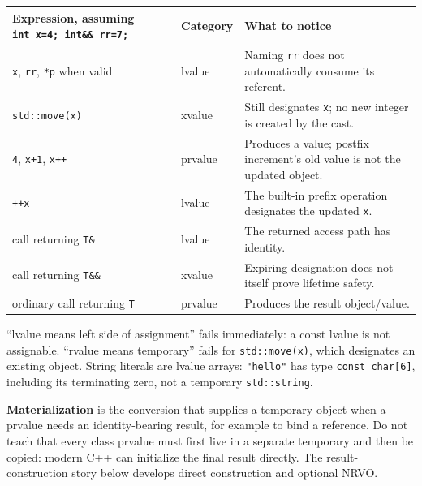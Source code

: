 {\def\LTcaptype{none} %
\begin{longtable}[]{@{}
  >{\raggedright\arraybackslash}p{}
  >{\raggedright\arraybackslash}p{}
  >{\raggedright\arraybackslash}p{}@{}}
\toprule\noalign{}
\begin{minipage}[b]{\linewidth}\raggedright
Expression, assuming \texttt{int\ x=4;\ int\&\&\ rr=7;}
\end{minipage} & \begin{minipage}[b]{\linewidth}\raggedright
Category
\end{minipage} & \begin{minipage}[b]{\linewidth}\raggedright
What to notice
\end{minipage} \\
\midrule\noalign{}
\endhead
\bottomrule\noalign{}
\endlastfoot
\texttt{x}, \texttt{rr}, \texttt{*p} when valid & lvalue & Naming \texttt{rr} does not automatically consume its referent. \\
\texttt{std::move(x)} & xvalue & Still designates \texttt{x}; no new integer is created by the cast. \\
\texttt{4}, \texttt{x+1}, \texttt{x++} & prvalue & Produces a value; postfix increment's old value is not the updated object. \\
\texttt{++x} & lvalue & The built-in prefix operation designates the updated \texttt{x}. \\
call returning \texttt{T\&} & lvalue & The returned access path has identity. \\
call returning \texttt{T\&\&} & xvalue & Expiring designation does not itself prove lifetime safety. \\
ordinary call returning \texttt{T} & prvalue & Produces the result object/value. \\
\end{longtable}
}

``lvalue means left side of assignment'' fails immediately: a const lvalue is not assignable. ``rvalue means temporary'' fails for \texttt{std::move(x)}, which designates an existing object. String literals are lvalue arrays: \texttt{"hello"} has type \texttt{const\ char{[}6{]}}, including its terminating zero, not a temporary \texttt{std::string}.

\textbf{Materialization} is the conversion that supplies a temporary object when a prvalue needs an identity-bearing result, for example to bind a reference. Do not teach that every class prvalue must first live in a separate temporary and then be copied: modern C++ can initialize the final result directly. The result-construction story below develops direct construction and optional NRVO.

